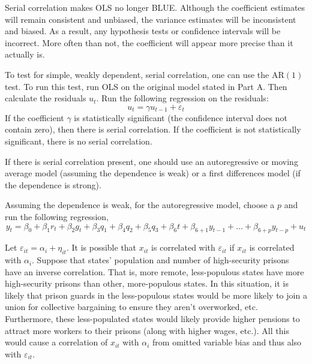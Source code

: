 \documentclass[12pt,twoside]{article}
\begin{document}
\begin{problems}
\begin{problemparts}
\problempart %

Serial correlation makes OLS no longer BLUE. Although the coefficient
estimates will remain consistent and unbiased, the variance estimates will be
inconsistent and biased. As a result, any hypothesis tests or confidence
intervals will be incorrect. More often than not, the coefficient will appear
more precise than it actually is.

\problempart %

To test for simple, weakly dependent, serial correlation, one can use the
$\mathrm{AR}(1)$ test. To run this test, run OLS on the original model stated
in Part A. Then calculate the residuals $u_t$. Run the following regression
on the residuals:
$$ u_t = \gamma u_{t - 1} + \varepsilon_t $$
If the coefficient $\gamma$ is statistically significant (the confidence
interval does not contain zero), then there is serial correlation. If the
coefficient is not statistically significant, there is no serial correlation.

\problempart %

If there is serial correlation present, one should use an autoregressive
or moving average model (assuming the dependence is weak) or a first
differences model (if the dependence is strong).

Assuming the dependence is weak, for the autoregressive model, choose a $p$
and run the following regression,
$$ y_t = \beta_0 + \beta_1 r_t + \beta_2 g_t + \beta_3 q_1 + \beta_4 q_2 +
\beta_5 q_3 + \beta_6 t + \beta_{6 + 1} y_{t - 1} + \ldots + \beta_{6 + p}
y_{t - p} + u_t $$

\end{problemparts}

\newpage

\problem  %

\begin{problemparts}

\problempart %

Let $\varepsilon_{it} = \alpha_i + \eta_{it}$. It is possible that $x_{it}$
is correlated with $\varepsilon_{it}$ if $x_{it}$ is correlated with
$\alpha_i$. Suppose that states' population and number of high-security
prisons have an inverse correlation. That is, more remote, less-populous
states have more high-security prisons than other, more-populous states. In
this situation, it is likely that prison guards in the less-populous states
would be more likely to join a union for collective bargaining to ensure they
aren't overworked, etc. Furthermore, these less-populated states would likely
provide higher pensions to attract more workers to their prisons (along with
higher wages, etc.). All this would cause a correlation of $x_{it}$ with
$\alpha_i$ from omitted variable bias and thus also with $\varepsilon_{it}$.


\end{problemparts}
\end{problems}
\end{document}
